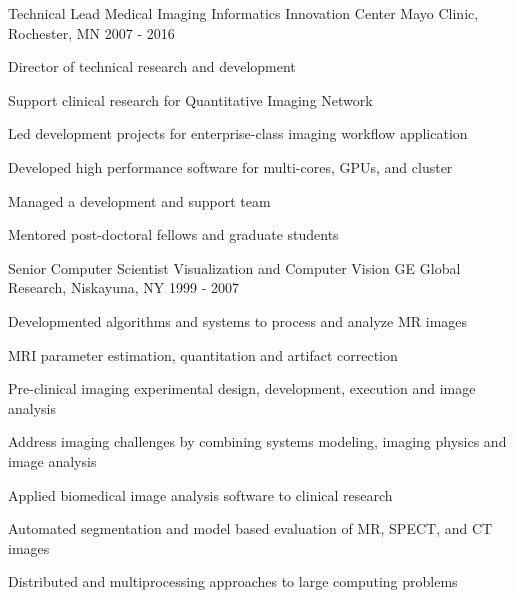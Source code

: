 \begin{cventries}
  \cventry
      {Technical Lead} %
      {Medical Imaging Informatics Innovation Center} %
      {Mayo Clinic, Rochester, MN} %
      {2007 - 2016} %
      { 
        \begin{cvitems}
        \item{Director of technical research and development}
        \item{Support clinical research for Quantitative Imaging Network}
        \item{Led development projects for enterprise-class imaging workflow application}
        \item{Developed high performance software for multi-cores, GPUs, and cluster}
        \item{Managed a development and support team}
        \item{Mentored post-doctoral fellows and graduate students}
        \end{cvitems}
      }
              
  \cventry
      {Senior Computer Scientist} %
      {Visualization and Computer Vision} %
      {GE Global Research, Niskayuna, NY} %
      {1999 - 2007} %
      { 
        \begin{cvitems}
        \item Developmented algorithms and systems to process and analyze MR images
        \item MRI parameter estimation, quantitation and artifact correction
        \item Pre-clinical imaging experimental design, development, execution and image analysis
        \item Address imaging challenges by combining systems modeling, imaging physics and image analysis
        \item Applied biomedical image analysis software to clinical research
        \item Automated segmentation and model based evaluation of MR, SPECT, and CT images
        \item Distributed and multiprocessing approaches to large computing problems
        \end{cvitems}
      }
                  
\end{cventries}
